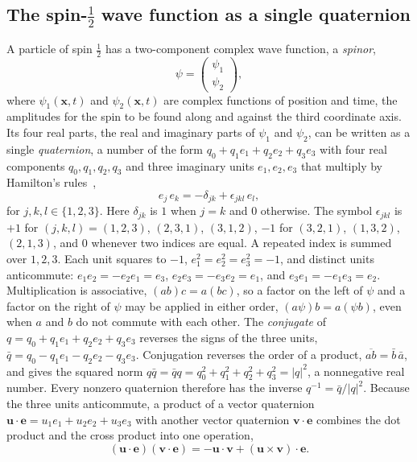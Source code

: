 \documentclass[aps,prd,onecolumn,tightenlines,nofootinbib,notitlepage,11pt,floatfix]{revtex4-2}
\theoremstyle{indentedtheorem}
\begin{document}
\subsection{The \texorpdfstring{spin-$\tfrac{1}{2}$}{spin-1/2} wave function as a single quaternion}
\label{sec:spinor}

A particle of spin $\tfrac{1}{2}$ has a two-component complex wave function, a \emph{spinor},
\begin{equation}
    \psi = \begin{pmatrix}\psi_1\\ \psi_2\end{pmatrix} ,
    \label{eq:spinor_components}
\end{equation}
where $\psi_1(\mathbf{x},t)$ and $\psi_2(\mathbf{x},t)$ are complex functions of position and time, the amplitudes for the spin to be found along and against the third coordinate axis. Its four real parts, the real and imaginary parts of $\psi_1$ and $\psi_2$, can be written as a single \emph{quaternion}, a number of the form $q_0+q_1e_1+q_2e_2+q_3e_3$ with four real components $q_0,q_1,q_2,q_3$ and three imaginary units $e_1,e_2,e_3$ that multiply by Hamilton's rules~\citep{Hamilton1844Quaternions},
\begin{equation}
    e_j \, e_k = -\delta_{jk} + \epsilon_{jkl} \, e_l ,
    \label{eq:quaternion_units}
\end{equation}
for $j,k,l\in\{1,2,3\}$. Here $\delta_{jk}$ is $1$ when $j=k$ and $0$ otherwise. The symbol $\epsilon_{jkl}$ is $+1$ for $(j,k,l)=(1,2,3)$, $(2,3,1)$, $(3,1,2)$, $-1$ for $(3,2,1)$, $(1,3,2)$, $(2,1,3)$, and $0$ whenever two indices are equal. A repeated index is summed over $1,2,3$. Each unit squares to $-1$, $e_1^2=e_2^2=e_3^2=-1$, and distinct units anticommute: $e_1e_2=-e_2e_1=e_3$, $e_2e_3=-e_3e_2=e_1$, and $e_3e_1=-e_1e_3=e_2$. Multiplication is associative, $(ab)c=a(bc)$, so a factor on the left of $\psi$ and a factor on the right of $\psi$ may be applied in either order, $(a\psi)b=a(\psi b)$, even when $a$ and $b$ do not commute with each other. The \emph{conjugate} of $q=q_0+q_1e_1+q_2e_2+q_3e_3$ reverses the signs of the three units, $\bar{q}=q_0-q_1e_1-q_2e_2-q_3e_3$. Conjugation reverses the order of a product, $\overline{ab}=\bar{b}\,\bar{a}$, and gives the squared norm $q\bar{q}=\bar{q}q=q_0^2+q_1^2+q_2^2+q_3^2=|q|^2$, a nonnegative real number. Every nonzero quaternion therefore has the inverse $q^{-1}=\bar{q}/|q|^2$. Because the three units anticommute, a product of a vector quaternion $\mathbf{u}\cdot\mathbf{e}=u_1e_1+u_2e_2+u_3e_3$ with another vector quaternion $\mathbf{v}\cdot\mathbf{e}$ combines the dot product and the cross product into one operation,
\begin{equation}
    (\mathbf{u}\cdot\mathbf{e})(\mathbf{v}\cdot\mathbf{e}) = -\mathbf{u}\cdot\mathbf{v} + (\mathbf{u}\times\mathbf{v})\cdot\mathbf{e} .
    \label{eq:vector_quaternion_product}
\end{equation}
\end{document}
